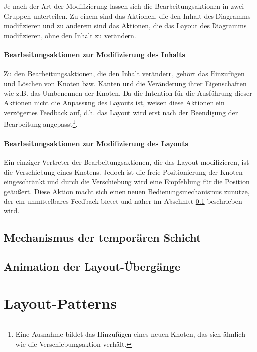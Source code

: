 Je nach der Art der Modifizierung lassen sich die Bearbeitungsaktionen in zwei Gruppen unterteilen. Zu einem sind das Aktionen, die den Inhalt des Diagramms modifizieren und zu anderem sind das Aktionen, die das Layout des Diagramms modifizieren, ohne den Inhalt zu verändern.

\paragraph{Bearbeitungsaktionen zur Modifizierung des Inhalts}

Zu den Bearbeitungsaktionen, die den Inhalt verändern, gehört das Hinzufügen und Löschen von Knoten bzw. Kanten und die Veränderung ihrer Eigenschaften wie z.B. das Umbenennen der Knoten. Da die Intention für die Ausführung dieser Aktionen nicht die Anpassung des Layouts ist, weisen diese Aktionen ein verzögertes Feedback auf, d.h. das Layout wird erst nach der Beendigung der Bearbeitung angepasst\footnote{Eine Ausnahme bildet das Hinzufügen eines neuen Knoten, das sich ähnlich wie die Verschiebungsaktion verhält.}.

\paragraph{Bearbeitungsaktionen zur Modifizierung des Layouts}

Ein einziger Vertreter der Bearbeitungsaktionen, die das Layout modifizieren, ist die Verschiebung eines Knotens. Jedoch ist die freie Positionierung der Knoten eingeschränkt und durch die Verschiebung wird eine Empfehlung für die Position geäußert. Diese Aktion macht sich einen neuen Bedienungsmechanismus zunutze, der ein unmittelbares Feedback bietet und näher im Abschnitt \ref{subsec:temporary-layer-mechanism} beschrieben wird.

\subsection{Mechanismus der temporären Schicht}
\label{subsec:temporary-layer-mechanism}

\subsection{Animation der Layout-Übergänge}
\label{subsec:animation-interaction}


\section{Layout-Patterns}
\label{sec:layout-patterns}


